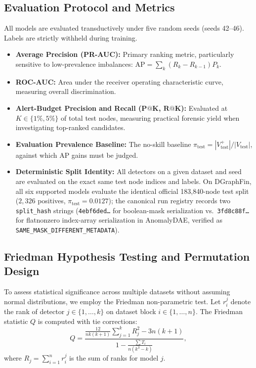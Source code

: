 \documentclass[11pt,a4paper]{article}
\begin{document}
\subsection{Evaluation Protocol and Metrics}
All models are evaluated transductively under five random seeds (seeds 42--46). Labels are strictly withheld during training.
\begin{itemize}
    \item \textbf{Average Precision (PR-AUC):} Primary ranking metric, particularly sensitive to low-prevalence imbalances: $\mathrm{AP} = \sum_k (R_k - R_{k-1}) P_k$.
    \item \textbf{ROC-AUC:} Area under the receiver operating characteristic curve, measuring overall discrimination.
    \item \textbf{Alert-Budget Precision and Recall ($\mathbf{P@K}$, $\mathbf{R@K}$):} Evaluated at $K \in \{1\%, 5\%\}$ of total test nodes, measuring practical forensic yield when investigating top-ranked candidates.
    \item \textbf{Evaluation Prevalence Baseline:} The no-skill baseline $\pi_{\mathrm{test}} = |V_{\mathrm{test}}^+| / |V_{\mathrm{test}}|$, against which AP gains must be judged.
    \item \textbf{Deterministic Split Identity:} All detectors on a given dataset and seed are evaluated on the exact same test node indices and labels. On DGraphFin, all six supported models evaluate the identical official 183,840-node test split ($2{,}326$ positives, $\pi_{\mathrm{test}} = 0.0127$); the canonical run registry records two \texttt{split\_hash} strings (\texttt{4ebf6ded\dots} for boolean-mask serialization vs.\ \texttt{3fd8c88f\dots} for flatnonzero index-array serialization in AnomalyDAE, verified as \texttt{SAME\_MASK\_DIFFERENT\_METADATA}).
\end{itemize}

\subsection{Friedman Hypothesis Testing and Permutation Design}
To assess statistical significance across multiple datasets without assuming normal distributions, we employ the Friedman non-parametric test. Let $r_i^j$ denote the rank of detector $j \in \{1, \dots, k\}$ on dataset block $i \in \{1, \dots, n\}$. The Friedman statistic $Q$ is computed with tie corrections:
\begin{equation}
Q = \frac{\frac{12}{n k (k+1)} \sum_{j=1}^k R_j^2 - 3 n (k+1)}{1 - \frac{\sum T_i}{n(k^3 - k)}},
\label{eq:friedman_q}
\end{equation}
where $R_j = \sum_{i=1}^n r_i^j$ is the sum of ranks for model $j$. 
\end{document}
